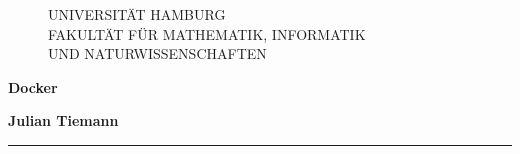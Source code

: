 \begin{titlepage}

  \setcounter{page}{0}

	\begin{figure}[h]
		UNIVERSITÄT HAMBURG\\
    FAKULTÄT FÜR MATHEMATIK, INFORMATIK \\
    UND NATURWISSENSCHAFTEN

		\vspace{1cm}
	\end{figure}

	\vfill

	\begin{center}
		\vspace{14mm}
		\noindent \textbf{\huge
		  Docker \\
		}
		\vspace{60mm}
	\end{center}

	\vfill

	\noindent \textbf{Julian Tiemann} \\
	\noindent \rule{\textwidth}{0.4mm}
	 \\
	 \\
	 \\


\end{titlepage}

